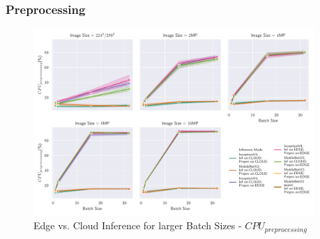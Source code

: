 \subsubsection{Preprocessing}
\begin{figure}[H]
\centering
\includegraphics[width=0.95\textwidth]{./Bilder/single_plots/batch_size_plots/Effects_of_Batch_size_Preprocessing_CPU_Usage.pdf}
\caption{Edge vs. Cloud Inference for larger Batch Sizes -  $CPU_{preprocessing}$}
\label{fig:BatchSizePreproCPU}
\end{figure}

